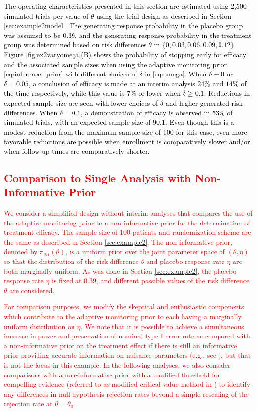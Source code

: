 \documentclass[12pt]{article}
\begin{document}
\textcolor{black}{
The operating characteristics presented in this section are estimated using 2,500 simulated trials per value of $\theta$ using the trial design as described in Section \ref{sec:example2model}. The generating response probability in the placebo group was assumed to be 0.39, and the generating response probability in the treatment group was determined based on risk differences $\theta$ in $\{0, 0.03, 0.06, 0.09, 0.12\}$. Figure \ref{fig:ex2varyomega}(B) shows the probability of stopping early for efficacy and the associated sample sizes when using the adaptive monitoring prior \eqref{eq:inference_prior} with different choices of $\delta$ in \eqref{eq:omega}. When $\delta=0$ or $\delta=0.05$, a conclusion of efficacy is made at an interim analysis $24\%$ and $14\%$ of the time respectively, while this value is $7\%$ or lower when $\delta \geq 0.1$. Reductions in expected sample size are seen with lower choices of $\delta$ and higher generated risk differences. When $\delta=0.1$, a demonstration of efficacy is observed in $53\%$ of simulated trials, with an expected sample size of 90.1. Even though this is a modest reduction from the maximum sample size of 100 for this case, even more favorable reductions are possible when enrollment is comparatively slower and/or when follow-up times are comparatively shorter.}

\textcolor{red}{
\subsection{Comparison to Single Analysis with Non-Informative Prior}\label{sec:non-informative}
We consider a simplified design without interim analyses that compares the use of the adaptive monitoring prior to a non-informative prior for the determination of treatment efficacy. The sample size of 100 patients and randomization scheme are the same as described in Section \ref{sec:example2}. The non-informative prior, denoted by $\pi_{NI}(\theta)$, is a uniform prior over the joint parameter space of $(\theta,\eta)$ so that the distribution of the risk difference $\theta$ and placebo response rate $\eta$ are both marginally uniform. As was done in Section \ref{sec:example2}, the placebo response rate $\eta$ is fixed at $0.39$, and different possible values of the risk difference $\theta$ are considered.}

\textcolor{red}{For comparison purposes, we modify the skeptical and enthusiastic components which contribute to the adaptive monitoring prior to each having a marginally uniform distribution on $\eta$. We note that it is possible to achieve a simultaneous increase in power and preservation of nominal type I error rate as compared with a non-informative prior on the treatment effect if there is still an informative prior providing accurate information on nuisance parameters (e.g., see \cite{Psioda2018a}), but that is not the focus in this example. In the following analyses, we also consider comparisons with a non-informative prior with a modified threshold for compelling evidence (referred to as modified critical value method in \cite{Psioda2018}) to identify any differences in null hypothesis rejection rates beyond a simple rescaling of the rejection rate at $\theta=\theta_0$.}
\end{document}
